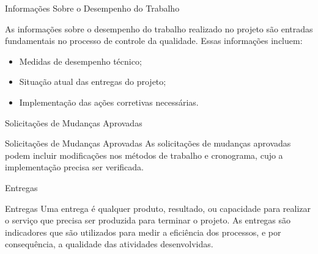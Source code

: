\documentclass[xcolor=x11names,compress]{beamer}
\begin{document}
\begin{frame}{Informações Sobre o Desempenho do Trabalho}

As informações sobre o desempenho do trabalho realizado no projeto são entradas fundamentais no processo de controle da qualidade. Essas informações incluem:

\begin{itemize}
\itemsep 5mm

\item Medidas de desempenho técnico;

\item Situação atual das entregas do projeto;

\item Implementação das ações corretivas necessárias.

\end{itemize}

\end{frame}

\begin{frame}{Solicitações de Mudanças Aprovadas}

\begin{alertblock}{Solicitações de Mudanças Aprovadas}
As solicitações de mudanças aprovadas podem incluir modificações nos métodos de trabalho e cronograma, cujo a implementação precisa ser verificada.
\end{alertblock}

\end{frame}

\begin{frame}{Entregas}

\begin{alertblock}{Entregas}
Uma entrega é qualquer produto, resultado, ou capacidade para realizar o serviço que precisa ser produzida para terminar o projeto. As entregas são indicadores que são utilizados para medir a eficiência dos processos, e por consequência, a qualidade das atividades desenvolvidas.
\end{alertblock}

\end{frame}
\end{document}
